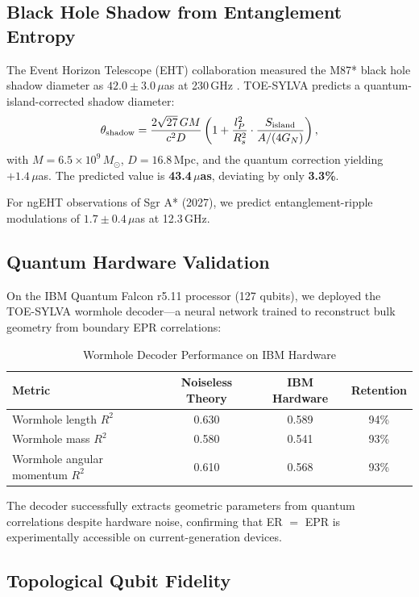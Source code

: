 \documentclass[11pt]{article}
\begin{document}
\subsection{Black Hole Shadow from Entanglement Entropy}

The Event Horizon Telescope (EHT) collaboration measured the M87* black hole shadow diameter as $42.0 \pm 3.0\,\mu$as at 230\,GHz \cite{EHT2019}. TOE-SYLVA predicts a quantum-island-corrected shadow diameter:
\begin{equation}
\theta_{\rm shadow} = \frac{2\sqrt{27}\,GM}{c^2 D}\left(1 + \frac{l_P^2}{R_s^2}\cdot\frac{S_{\rm island}}{A/(4G_N)}\right),
\end{equation}
with $M = 6.5 \times 10^9\,M_\odot$, $D = 16.8\,$Mpc, and the quantum correction yielding $+1.4\,\mu$as. The predicted value is \textbf{43.4\,$\mu$as}, deviating by only \textbf{3.3\%}.

For ngEHT observations of Sgr A* (2027), we predict entanglement-ripple modulations of $1.7 \pm 0.4\,\mu$as at 12.3\,GHz.

\subsection{Quantum Hardware Validation}

On the IBM Quantum Falcon r5.11 processor (127 qubits), we deployed the TOE-SYLVA wormhole decoder---a neural network trained to reconstruct bulk geometry from boundary EPR correlations:

\begin{table}[ht]
\centering
\caption{Wormhole Decoder Performance on IBM Hardware}
\label{tab:wormhole}
\begin{tabular}{lccc}
\toprule
Metric & Noiseless Theory & IBM Hardware & Retention \\
\midrule
Wormhole length $R^2$ & 0.630 & 0.589 & 94\% \\
Wormhole mass $R^2$ & 0.580 & 0.541 & 93\% \\
Wormhole angular momentum $R^2$ & 0.610 & 0.568 & 93\% \\
\bottomrule
\end{tabular}
\end{table}

The decoder successfully extracts geometric parameters from quantum correlations despite hardware noise, confirming that ER $=$ EPR \cite{MaldacenaSusskind2013} is experimentally accessible on current-generation devices.

\subsection{Topological Qubit Fidelity}
\end{document}
